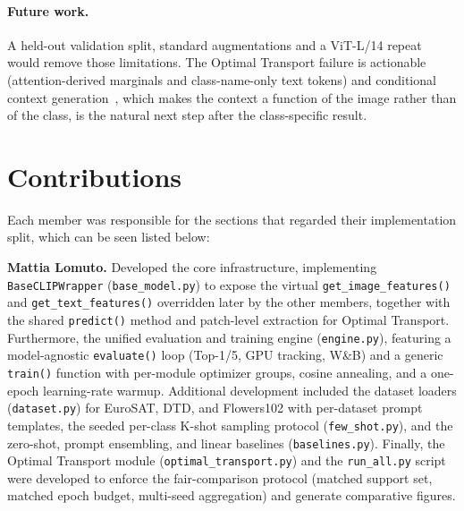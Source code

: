 \documentclass[10pt,twocolumn,letterpaper]{article}
\begin{document}
\paragraph{Future work.}
A held-out validation split, standard augmentations and a ViT-L/14 repeat
would remove those limitations.  The Optimal Transport failure is
actionable (attention-derived marginals and class-name-only text
tokens) and conditional context generation~\cite{zhou2022conditional},
which makes the context a function of the image rather than of the class,
is the natural next step after the class-specific result.


\section{Contributions}\label{sec:contributions}
Each member was responsible for the sections that regarded their implementation split, which can be seen listed below:

\noindent\textbf{Mattia Lomuto.} Developed the core infrastructure, implementing \texttt{BaseCLIPWrapper} (\texttt{base\_model.py}) to expose the virtual \texttt{get\_image\_features()} and \texttt{get\_text\_features()} overridden later by the other members, together with the shared \texttt{predict()} method and patch-level extraction for Optimal Transport. Furthermore, the unified evaluation and training engine (\texttt{engine.py}), featuring a model-agnostic \texttt{evaluate()} loop (Top-1/5, GPU tracking, W\&B) and a generic \texttt{train()} function with per-module optimizer groups, cosine annealing, and a one-epoch learning-rate warmup. Additional development included the dataset loaders (\texttt{dataset.py}) for EuroSAT, DTD, and Flowers102 with per-dataset prompt templates, the seeded per-class K-shot sampling protocol (\texttt{few\_shot.py}), and the zero-shot, prompt ensembling, and linear baselines (\texttt{baselines.py}). Finally, the Optimal Transport module (\texttt{optimal\_transport.py}) and the \texttt{run\_all.py} script were developed to enforce the fair-comparison protocol (matched support set, matched epoch budget, multi-seed aggregation) and generate comparative figures.

\medskip
\end{document}
